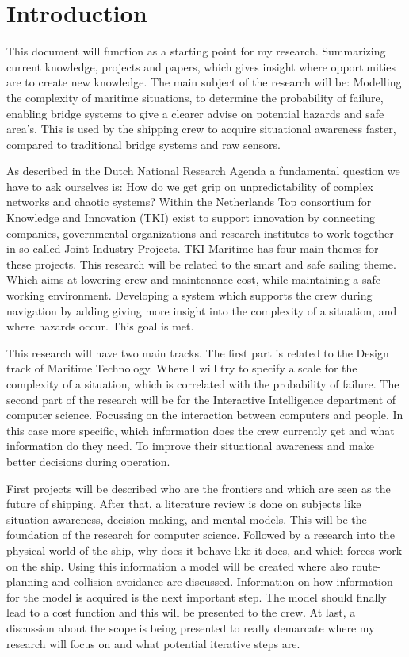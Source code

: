 \chapter*{Introduction}
\label{sec:introduction}
This document will function as a starting point for my research. Summarizing current knowledge, projects and papers, which gives insight where opportunities are to create new knowledge. The main subject of the research will be: Modelling the complexity of maritime situations, to determine the probability of failure, enabling bridge systems to give a clearer advise on potential hazards and safe area's. This is used by the shipping crew to acquire situational awareness faster, compared to traditional bridge systems and raw sensors.

As described in the Dutch National Research Agenda a fundamental question we have to ask ourselves is: How do we get grip on unpredictability of complex networks and chaotic systems? Within the Netherlands Top consortium for Knowledge and Innovation (TKI) exist to support innovation by connecting companies, governmental organizations and research institutes to work together in so-called Joint Industry Projects. TKI Maritime has four main themes for these projects. This research will be related to the smart and safe sailing theme. Which aims at lowering crew and maintenance cost, while maintaining a safe working environment. Developing a system which supports the crew during navigation by adding giving more insight into the complexity of a situation, and where hazards occur. This goal is met.

This research will have two main tracks. The first part is related to the Design track of Maritime Technology. Where I will try to specify a scale for the complexity of a situation, which is correlated with the probability of failure. The second part of the research will be for the Interactive Intelligence department of computer science. Focussing on the interaction between computers and people. In this case more specific, which information does the crew currently get and what information do they need. To improve their situational awareness and make better decisions during operation.

First projects will be described who are the frontiers and which are seen as the future of shipping.
After that, a literature review is done on subjects like situation awareness, decision making, and mental models. This will be the foundation of the research for computer science. 
Followed by a research into the physical world of the ship, why does it behave like it does, and which forces work on the ship. Using this information a model will be created where also route-planning and collision avoidance are discussed. 
Information on how information for the model is acquired is the next important step. The model should finally lead to a cost function and this will be presented to the crew. 
At last, a discussion about the scope is being presented to really demarcate where my research will focus on and what potential iterative steps are. 
